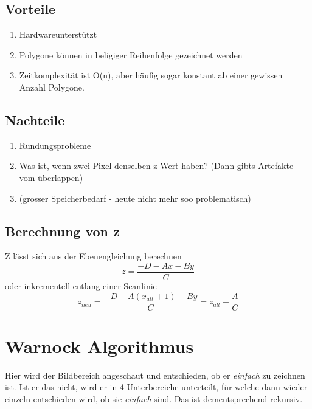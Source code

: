 \subsection{Vorteile}
\begin{enumerate}
	\item Hardwareunterstützt
	\item Polygone können in beligiger Reihenfolge gezeichnet werden
	\item Zeitkomplexität ist O(n), aber häufig sogar konstant ab einer gewissen Anzahl Polygone.
\end{enumerate}
\subsection{Nachteile}
\begin{enumerate}
	\item Rundungsprobleme
	\item Was ist, wenn zwei Pixel denselben z Wert haben? (Dann gibts Artefakte vom überlappen)
	\item (grosser Speicherbedarf - heute nicht mehr soo problematisch)
\end{enumerate}
\subsection{Berechnung von z}
Z lässt sich aus der Ebenengleichung berechnen
\begin{displaymath}
z = \frac{-D-Ax-By}{C}
\end{displaymath}
oder inkrementell entlang einer Scanlinie
\begin{displaymath}
z_{neu} = \frac{-D-A(x_{alt}+1)-By}{C}=z_{alt}-\frac{A}{C}
\end{displaymath}


\section{Warnock Algorithmus}
Hier wird der Bildbereich angeschaut und entschieden, ob er \textit{einfach} zu zeichnen ist. Ist er das nicht, wird er in 4 Unterbereiche unterteilt, für welche dann wieder einzeln entschieden wird, ob sie \textit{einfach} sind. Das ist dementsprechend rekursiv.
